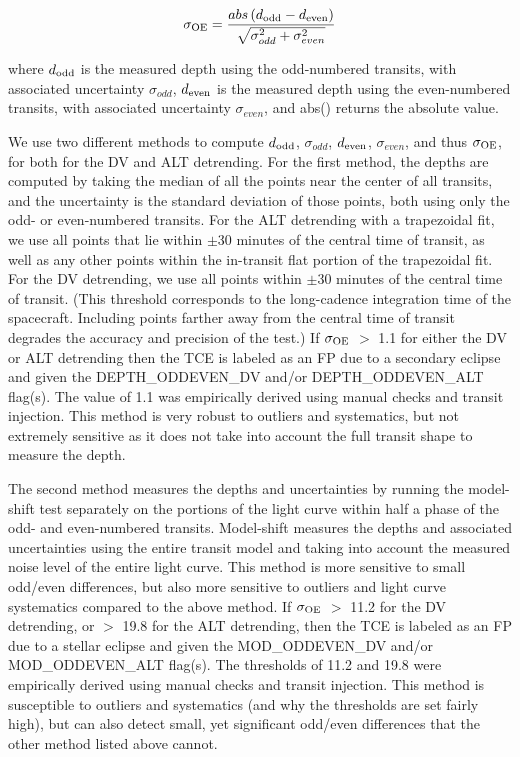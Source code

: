\begin{equation}
\sigma_{\rm OE} = \frac{abs\left(d_{\rm odd} - d_{\rm even}\right)}{\sqrt{\sigma_{odd}^{2} + \sigma_{even}^{2}}} 
\end{equation}

\noindent where $d_{\rm odd}$ is the measured depth using the odd-numbered transits, with associated uncertainty $\sigma_{odd}$, $d_{\rm even}$ is the measured depth using the even-numbered transits, with associated uncertainty $\sigma_{even}$, and abs() returns the absolute value.

We use two different methods to compute $d_{\rm odd}$, $\sigma_{odd}$, $d_{\rm even}$, $\sigma_{even}$, and thus $\sigma_{\rm OE}$, for both for the DV and ALT detrending. For the first method, the depths are computed by taking the median of all the points near the center of all transits, and the uncertainty is the standard deviation of those points, both using only the odd- or even-numbered transits. For the ALT detrending with a trapezoidal fit, we use all points that lie within $\pm$30 minutes of the central time of transit, as well as any other points within the in-transit flat portion of the trapezoidal fit. For the DV detrending, we use all points within $\pm$30 minutes of the central time of transit. (This threshold corresponds to the long-cadence integration time of the \kepler{} spacecraft. Including points farther away from the central time of transit degrades the accuracy and precision of the test.) If $\sigma_{\rm OE}$ $>$ 1.1 for either the DV or ALT detrending then the TCE is labeled as an FP due to a secondary eclipse and given the DEPTH\_ODDEVEN\_DV and/or DEPTH\_ODDEVEN\_ALT flag(s). The value of 1.1 was empirically derived using manual checks and transit injection. This method is very robust to outliers and systematics, but not extremely sensitive as it does not take into account the full transit shape to measure the depth.

The second method measures the depths and uncertainties by running the model-shift test separately on the portions of the light curve within half a phase of the odd- and even-numbered transits. Model-shift measures the depths and associated uncertainties using the entire transit model and taking into account the measured noise level of the entire light curve. This method is more sensitive to small odd/even differences, but also more sensitive to outliers and light curve systematics compared to the above method. If $\sigma_{\rm OE}$ $>$ 11.2 for the DV detrending, or $>$ 19.8 for the ALT detrending, then the TCE is labeled as an FP due to a stellar eclipse and given the MOD\_ODDEVEN\_DV and/or MOD\_ODDEVEN\_ALT flag(s). The thresholds of 11.2 and 19.8 were empirically derived using manual checks and transit injection. This method is susceptible to outliers and systematics (and why the thresholds are set fairly high), but can also detect small, yet significant odd/even differences that the other method listed above cannot.


